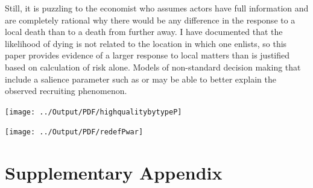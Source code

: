 \documentclass[12pt] {article}
\begin{document}
Still, it is puzzling to the economist who assumes actors have full
information and are completely rational why there would be any difference
in the response to a local death than to a death from further away.
I have documented that the likelihood of dying is not related to the
location in which one enlists, so this paper provides evidence of
a larger response to local matters than is justified based on calculation
of risk alone. Models of non-standard decision making that include
a salience parameter such as \cite{ChettySalience} or \cite{eBayEarly}
may be able to better explain the observed recruiting phenomenon. 

\newpage




\pagebreak{}
\begin{table}
\caption{}
\label{Flo: Recs by Quality}\texttt{[image: ../Output/PDF/highqualitybytypeP]}
\end{table}



\pagebreak{}
\begin{table}
\caption{}
\label{Flo:Deaths by War}
\texttt{[image: ../Output/PDF/redefPwar]}
\end{table}



\clearpage{}





\appendix

\section{Supplementary Appendix}
\setcounter{table}{0}
\renewcommand{\thetable}{A\arabic{table}}

\setcounter{figure}{0}
\renewcommand{\thefigure}{A\arabic{figure}}


\end{document}
